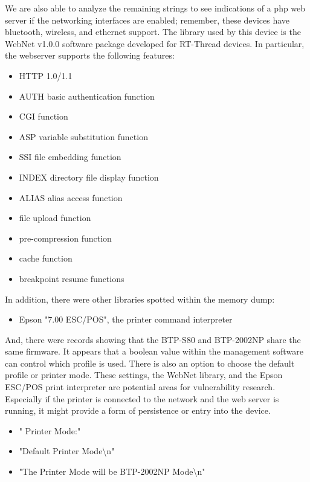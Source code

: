We are also able to analyze the remaining strings to see indications of a php web server if the networking interfaces are enabled; remember, these devices have bluetooth, wireless, and ethernet support. The library used by this device is the WebNet v1.0.0 software package developed for RT-Thread devices. In particular, the webserver supports the following features:

\begin{itemize}
    \item HTTP 1.0/1.1
    \item AUTH basic authentication function
    \item CGI function
    \item ASP variable substitution function
    \item SSI file embedding function
    \item INDEX directory file display function
    \item ALIAS alias access function
    \item file upload function
    \item pre-compression function
    \item cache function
    \item breakpoint resume functions
\end{itemize}

In addition, there were other libraries spotted within the memory dump:

\begin{itemize}
    \item Epson "7.00 ESC/POS", the printer command interpreter
\end{itemize}

And, there were records showing that the BTP-S80 and BTP-2002NP share the same firmware. It appears that a boolean value within the management software can control which profile is used. There is also an option to choose the default profile or printer mode. These settings, the WebNet library, and the Epson ESC/POS print interpreter are potential areas for vulnerability research. Especially if the printer is connected to the network and the web server is running, it might provide a form of persistence or entry into the device. 

\begin{itemize}
    \item "  Printer Mode:"
    \item "Default Printer Mode\textbackslash n"
    \item "The Printer Mode will be BTP-2002NP Mode\textbackslash n"
\end{itemize}

